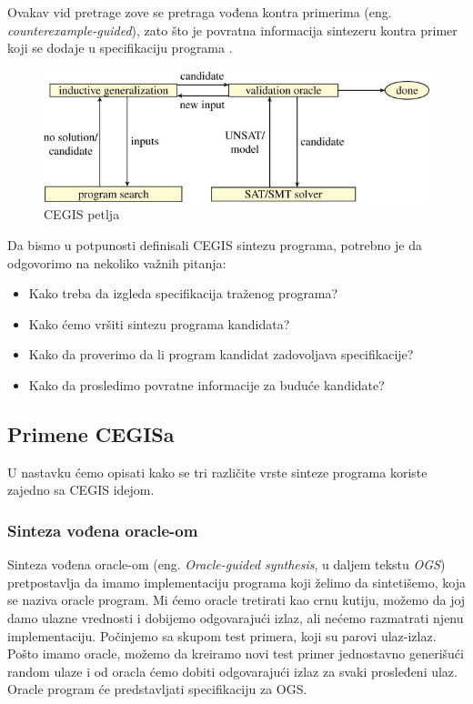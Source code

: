 Ovakav vid pretrage zove se pretraga vođena kontra primerima (eng. \emph{counterexample-guided}), zato što je povratna informacija sintezeru kontra primer koji se dodaje u specifikaciju programa \cite{PSE}. 

\begin{figure}[t]
    \begin{center}
        \includegraphics[scale=0.4]{resources/cegis.jpeg}
    \end{center}
    \caption{CEGIS petlja \cite{AboutPS}}
    \label{fig:cegis}
\end{figure}


Da bismo u potpunosti definisali CEGIS sintezu programa, potrebno je da odgovorimo na nekoliko važnih pitanja:

\begin{itemize}
    \item Kako treba da izgleda specifikacija traženog programa?
    \item Kako ćemo vršiti sintezu programa kandidata?
    \item Kako da proverimo da li program kandidat zadovoljava specifikacije?
    \item Kako da prosledimo povratne informacije za buduće kandidate?
\end{itemize}

\subsection{Primene CEGISa}
\label{subsec:PrimeneCEGISa}

U nastavku ćemo opisati kako se tri različite vrste sinteze programa koriste zajedno sa CEGIS idejom.


\subsubsection{Sinteza vođena oracle-om}
\label{subsec:OracleGuidedSynthesis}

Sinteza vođena oracle-om (eng. \emph{Oracle-guided synthesis}, u daljem tekstu \emph{OGS}) \cite{PSE} pretpostavlja da imamo implementaciju programa koji želimo da sintetišemo, koja se naziva oracle program. Mi ćemo oracle tretirati kao crnu kutiju, možemo da joj damo ulazne vrednosti i dobijemo odgovarajući izlaz, ali nećemo razmatrati njenu implementaciju. Počinjemo sa skupom test primera, koji su parovi ulaz-izlaz. Pošto imamo oracle, možemo da kreiramo novi test primer jednostavno generišući random ulaze i od oracla ćemo dobiti odgovarajući izlaz za svaki prosleđeni ulaz. Oracle program će predstavljati specifikaciju za OGS.


